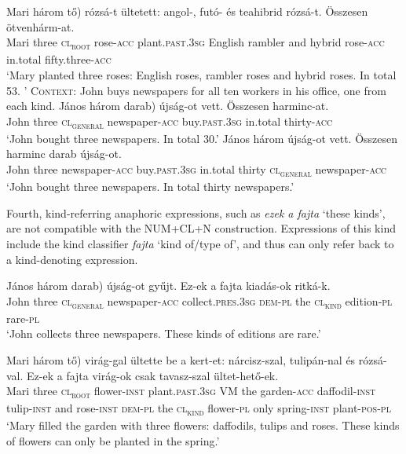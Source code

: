 \documentclass[output=paper]{langscibook}
\begin{document}
\ea \label{schv-nem:ex:16}
\gll Mari három \minsp{(*} tő) rózsá-t ültetett: angol-, futó- és teahibrid  rózsá-t. Összesen ötvenhárm-at. \\
 Mari three {} \textsc{cl\textsubscript{root}} rose-\textsc{acc} plant.\textsc{past}.\textsc{3sg} English  rambler and  hybrid  rose-\textsc{acc}  in.total    fifty.three-\textsc{acc}\\
\glt `Mary planted three roses: English roses, rambler roses and hybrid roses. In total 53. '
\ex \label{schv-nem:ex:17} \textsc{Context}: John buys newspapers for all ten workers in his office, one from each kind.
\ea \label{schv-nem:ex:17b}
\gll János három \minsp{(*} darab) újság-ot vett. Összesen  harminc-at. \\
John  three {} \textsc{cl\textsubscript{general}} newspaper-\textsc{acc} buy.\textsc{past}.\textsc{3sg} in.total thirty-\textsc{acc}\\
\glt `John bought three newspapers. In total 30.'
\ex \label{schv-nem:ex:17c} 
\gll János három újság-ot vett. Összesen harminc darab újság-ot. \\
John  three  newspaper-\textsc{acc} buy.\textsc{past}.\textsc{3sg} in.total thirty \textsc{cl\textsubscript{general}} newspaper-\textsc{acc}\\
\glt `John bought three newspapers. In total thirty newspapers.'
\z
\z

\noindent Fourth, kind-referring anaphoric expressions, such as \textit{ezek a fajta} `these kinds', are not compatible with the NUM+CL+N construction. Expressions of this kind include the kind classifier \textit{fajta} `kind of/type of', and thus can only refer back to a kind-denoting expression.

\ea \label{schv-nem:ex:18}
\gll János három \minsp{(*} darab) újság-ot gyűjt. Ez-ek a fajta kiadás-ok ritká-k. \\
John three {} \textsc{cl\textsubscript{general}} newspaper-\textsc{acc} collect.\textsc{pres}.\textsc{3sg} \textsc{dem}-\textsc{pl} the \textsc{cl\textsubscript{kind}} edition-\textsc{pl} rare-\textsc{pl}\\
\glt `John collects three newspapers. These kinds of editions are rare.'
\z 

\ea \label{schv-nem:ex:19}
\gll Mari három \minsp{(*} tő) virág-gal ültette be a kert-et: nárcisz-szal, tulipán-nal és rózsá-val. Ez-ek a fajta virág-ok csak tavasz-szal ültet-hető-ek. \\
Mari three {} \textsc{cl\textsubscript{root}} flower-\textsc{inst} plant.\textsc{past}.\textsc{3sg} VM the garden-\textsc{acc} daffodil-\textsc{inst} tulip-\textsc{inst} and rose-\textsc{inst}  \textsc{dem}-\textsc{pl} the \textsc{cl\textsubscript{kind}} flower-\textsc{pl} only spring-\textsc{inst} plant-\textsc{pos}-\textsc{pl}\\
\glt ‘Mary filled the garden with three flowers: daffodils, tulips and roses. These kinds of flowers can only be planted in the spring.'
\z 
\end{document}
